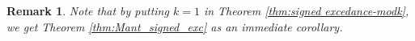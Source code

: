\documentclass[12pt]{article}
\newcommand{\SSS}{\mathfrak{S}}
\newcommand{\AAA}{\mathcal{A}}
\newcommand{\PAP}{\mathrm{PAP}}
\newcommand{\NPAP}{\mathrm{NPAP}}
\newcommand{\inv}{\mathrm{inv}}
\newcommand{\exc}{\mathrm{exc}}
\newtheorem{theorem}{\bf Theorem}[section]
\newtheorem{corollary}[lemma]{\bf Corollary}
\newtheorem{remark}{\bf Remark}[section]
\begin{document}
\begin{remark}
Note that by putting $k=1$ in Theorem \ref{thm:signed excedance-modk}, we get Theorem \ref{thm:Mant_signed_exc} as an immediate corollary. 
\end{remark}





\end{document}
